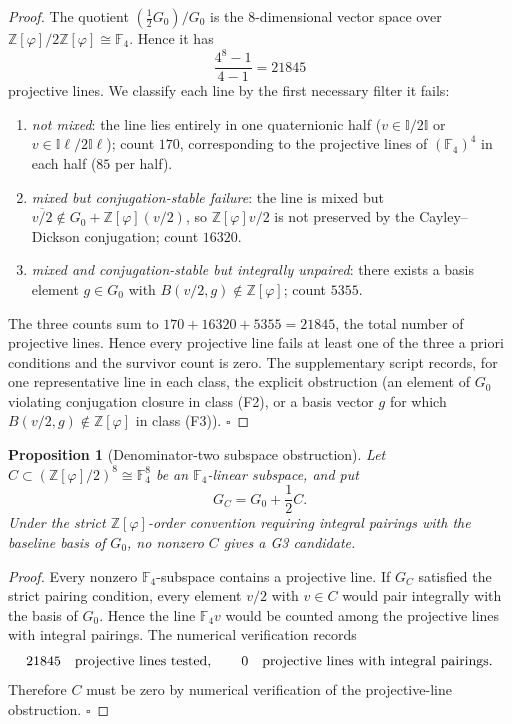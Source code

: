 \documentclass[12pt,oneside,english]{amsart}
\numberwithin{equation}{section}
\numberwithin{figure}{section}
\numberwithin{table}{section}
\theoremstyle{plain}
\newtheorem{proposition}[theorem]{Proposition}
\theoremstyle{definition}
\theoremstyle{remark}
\newcommand{\Zphi}{\mathbb Z[\varphi]}
\begin{document}
\begin{proof}
The quotient \((\tfrac12 G_0)/G_0\) is the \(8\)-dimensional vector space over \(\Zphi/2\Zphi\cong\mathbb F_4\). Hence it has
\begin{equation}
\frac{4^8-1}{4-1}=21845
\label{eq:f4-lines}
\end{equation}
projective lines. We classify each line by the first necessary filter it fails:
\begin{enumerate}
\item[(F1)] \emph{not mixed}: the line lies entirely in one quaternionic half (\(v\in\mathbb I/2\mathbb I\) or \(v\in\mathbb I\ell/2\mathbb I\ell\)); count \(170\), corresponding to the projective lines of \((\mathbb F_4)^{4}\) in each half (\(85\) per half).
\item[(F2)] \emph{mixed but conjugation-stable failure}: the line is mixed but \(\overline{v/2}\notin G_0+\Zphi(v/2)\), so \(\Zphi v/2\) is not preserved by the Cayley--Dickson conjugation; count \(16320\).
\item[(F3)] \emph{mixed and conjugation-stable but integrally unpaired}: there exists a basis element \(g\in G_0\) with \(B(v/2,g)\notin\Zphi\); count \(5355\).
\end{enumerate}
The three counts sum to \(170+16320+5355=21845\), the total number of projective lines. Hence every projective line fails at least one of the three a priori conditions and the survivor count is zero. The supplementary script records, for one representative line in each class, the explicit obstruction (an element of \(G_0\) violating conjugation closure in class (F2), or a basis vector \(g\) for which \(B(v/2,g)\notin\Zphi\) in class (F3)). \(\square\)
\end{proof}

\begin{proposition}[Denominator-two subspace obstruction]
Let \(C\subset(\Zphi/2)^8\cong\mathbb F_4^8\) be an \(\mathbb F_4\)-linear subspace, and put
\begin{equation}
G_C=G_0+\frac12 C.
\label{eq:subspace-gluing}
\end{equation}
Under the strict \(\Zphi\)-order convention requiring integral pairings with the baseline basis of \(G_0\), no nonzero \(C\) gives a G3 candidate.
\end{proposition}

\begin{proof}
Every nonzero \(\mathbb F_4\)-subspace contains a projective line. If \(G_C\) satisfied the strict pairing condition, every element \(v/2\) with \(v\in C\) would pair integrally with the basis of \(G_0\). Hence the line \(\mathbb F_4v\) would be counted among the projective lines with integral pairings. The numerical verification records
\begin{equation}
21845\quad\hbox{projective lines tested},\qquad
0\quad\hbox{projective lines with integral pairings}.
\end{equation}
Therefore \(C\) must be zero by numerical verification of the projective-line obstruction.
\(\square\)
\end{proof}
\end{document}
